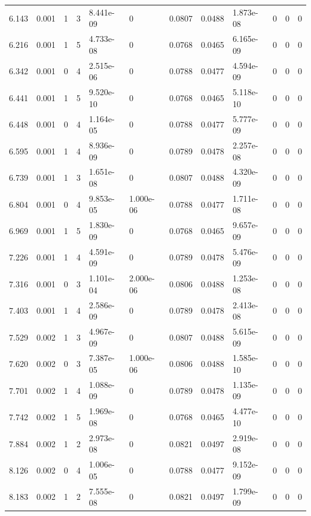 \documentclass[preview]{standalone}
\begin{document}
{{{\begin{tabular}{L{1.2cm}C{1.2cm} C{0.3cm}C{0.5cm} C{1.4cm}C{1.4cm} C{1.4cm}C{1.4cm} C{1.6cm}C{1.6cm} C{1.6cm}C{1.6cm}}
  6.143  &  0.001  & 1     &  3 &  8.441e-09  & 0  &  0.0807&   0.0488& 1.873e-08 & 0   &  0 & 0  \\ 
  6.216  &  0.001  & 1     &  5 &  4.733e-08  & 0  &  0.0768&   0.0465& 6.165e-09 & 0   &  0 & 0  \\ 
  6.342  &  0.001  & 0     &  4 &  2.515e-06  & 0  &  0.0788&   0.0477& 4.594e-09 & 0   &  0 & 0  \\ 
  6.441  &  0.001  & 1     &  5 &  9.520e-10  & 0  &  0.0768&   0.0465& 5.118e-10 & 0   &  0 & 0  \\ 
  6.448  &  0.001  & 0     &  4 &  1.164e-05  & 0  &  0.0788&   0.0477& 5.777e-09 & 0   &  0 & 0  \\ 
  6.595  &  0.001  & 1     &  4 &  8.936e-09  & 0  &  0.0789&   0.0478& 2.257e-08 & 0   &  0 & 0  \\ 
  6.739  &  0.001  & 1     &  3 &  1.651e-08  & 0  &  0.0807&   0.0488& 4.320e-09 & 0   &  0 & 0  \\ 
  6.804  &  0.001  & 0     &  4 &  9.853e-05  & 1.000e-06  &  0.0788&   0.0477& 1.711e-08 & 0   &  0 & 0  \\ 
  6.969  &  0.001  & 1     &  5 &  1.830e-09  & 0  &  0.0768&   0.0465& 9.657e-09 & 0   &  0 & 0  \\ 
  7.226  &  0.001  & 1     &  4 &  4.591e-09  & 0  &  0.0789&   0.0478& 5.476e-09 & 0   &  0 & 0  \\ 
  7.316  &  0.001  & 0     &  3 &  1.101e-04  & 2.000e-06  &  0.0806&   0.0488& 1.253e-08 & 0   &  0 & 0  \\ 
  7.403  &  0.001  & 1     &  4 &  2.586e-09  & 0  &  0.0789&   0.0478& 2.413e-08 & 0   &  0 & 0  \\ 
  7.529  &  0.002  & 1     &  3 &  4.967e-09  & 0  &  0.0807&   0.0488& 5.615e-09 & 0   &  0 & 0  \\ 
  7.620  &  0.002  & 0     &  3 &  7.387e-05  & 1.000e-06  &  0.0806&   0.0488& 1.585e-10 & 0   &  0 & 0  \\ 
  7.701  &  0.002  & 1     &  4 &  1.088e-09  & 0  &  0.0789&   0.0478& 1.135e-09 & 0   &  0 & 0  \\ 
  7.742  &  0.002  & 1     &  5 &  1.969e-08  & 0  &  0.0768&   0.0465& 4.477e-10 & 0   &  0 & 0  \\ 
  7.884  &  0.002  & 1     &  2 &  2.973e-08  & 0  &  0.0821&   0.0497& 2.919e-08 & 0   &  0 & 0  \\ 
  8.126  &  0.002  & 0     &  4 &  1.006e-05  & 0  &  0.0788&   0.0477& 9.152e-09 & 0   &  0 & 0  \\ 
  8.183  &  0.002  & 1     &  2 &  7.555e-08  & 0  &  0.0821&   0.0497& 1.799e-09 & 0   &  0 & 0  \\ 

\end{tabular}}}}
\end{document}
